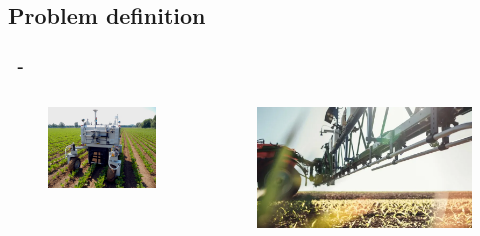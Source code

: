 \documentclass{beamer}
\begin{document}
\subsection{Problem definition}
\begin{frame}
\frametitle{\secname\ - \subsecname}
\begin{columns}[c]
\begin{figure}
\includegraphics[width=1\linewidth]{Imagens/unibonn.png}
\end{figure}

\begin{figure}
\includegraphics[width=1\linewidth]{Imagens/bosh.png}
\end{figure}
\end{columns}
\end{frame}
\end{document}
